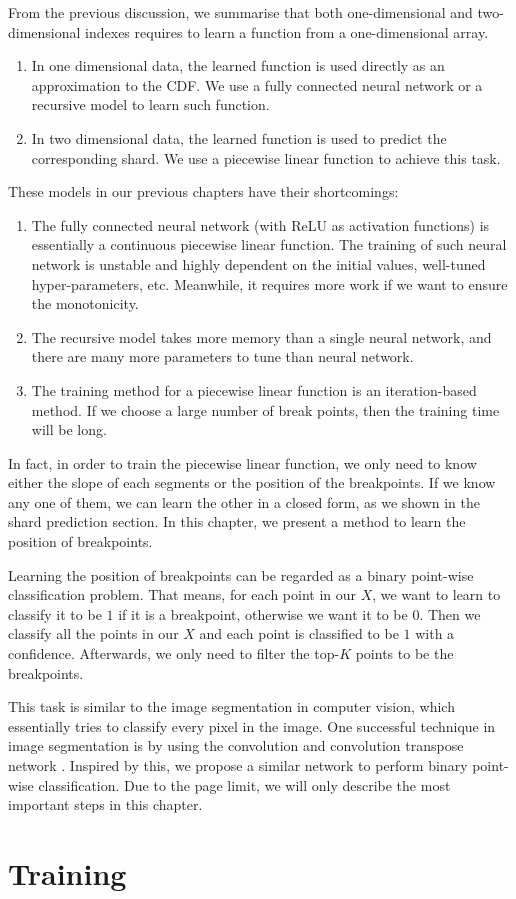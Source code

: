 From the previous discussion, we summarise that both one-dimensional and two-dimensional indexes requires to learn a function from a one-dimensional array. 
\begin{enumerate}
	\item In one dimensional data, the learned function is used directly as an approximation to the CDF. We use a fully connected neural network or a recursive model to learn such function.
	\item In two dimensional data, the learned function is used to predict the corresponding shard. We use a piecewise linear function to achieve this task.
\end{enumerate}

These models in our previous chapters have their shortcomings:

\begin{enumerate}
	\item The fully connected neural network (with ReLU as activation functions) is essentially a continuous piecewise linear function. The training of such neural network is unstable and highly dependent on the initial values, well-tuned hyper-parameters, etc. Meanwhile, it requires more work if we want to ensure the monotonicity.
	\item The recursive model takes more memory than a single neural network, and there are many more parameters to tune than neural network. 
	\item The training method for a piecewise linear function is an iteration-based method. If we choose a large number of break points, then the training time will be long.
\end{enumerate}

In fact, in order to train the piecewise linear function, we only need to know either the slope of each segments or the position of the breakpoints. If we know any one of them, we can learn the other in a closed form, as we shown in the shard prediction section. In this chapter, we present a method to learn the position of breakpoints.

Learning the position of breakpoints can be regarded as a binary point-wise classification problem. That means, for each point in our $X$, we want to learn to classify it to be $1$ if it is a breakpoint, otherwise we want it to be $0$. Then we classify all the points in our $X$ and each point is classified to be $1$ with a confidence. Afterwards, we only need to filter the top-$K$ points to be the breakpoints.

This task is similar to the image segmentation in computer vision, which essentially tries to classify every pixel in the image. One successful technique in image segmentation is by using the convolution and convolution transpose network \cite{long2015fully}. Inspired by this, we propose a similar network to perform binary point-wise classification. Due to the page limit, we will only describe the most important steps in this chapter.

\section{Training}


